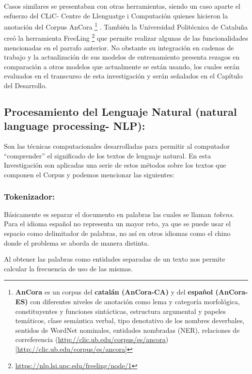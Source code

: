 \documentclass[
  10,
  openany]{book}
\begin{document}
Casos similares se presentaban con otras herramientas, siendo un caso aparte el esfuerzo del CLiC- Centre de Llenguatge i Computación quienes hicieron la anotación del Corpus AnCora \footnote{\textbf{AnCora} es un corpus del \textbf{catalán (AnCora-CA)} y del \textbf{español (AnCora-ES)} con diferentes niveles de anotación como lema y categoría morfológica, constituyentes y funciones sintácticas, estructura argumental y papeles temáticos, clase semántica verbal, tipo denotativo de los nombres deverbales, sentidos de WordNet nominales, entidades nombradas (NER), relaciones de correferencia (\url{http://clic.ub.edu/corpus/es/ancora}){[}\url{http://clic.ub.edu/corpus/es/ancora}{]}} . También la Universidad Politécnica de Cataluña creó la herramienta FreeLing \footnote{\url{https://nlp.lsi.upc.edu/freeling/node/1}} que permite realizar algunas de las funcionalidades mencionadas en el parrafo anterior. No obstante su integración en cadenas de trabajo y la actualización de sus modelos de entrenamiento presenta rezagos en comparación a otros modelos que actualmente se están usando, los cuales serán evaluados en el transcurso de esta investigación y serán señalados en el Capítulo del Desarrollo.

\hypertarget{nlproc}{%
\subsection{Procesamiento del Lenguaje Natural (natural language processing- NLP):}\label{nlproc}}

Son las técnicas computacionales desarrolladas para permitir al computador ``comprender'' el significado de los textos de lenguaje natural. En esta Investigación son aplicadas una serie de estos métodos sobre los textos que componen el Corpus y podemos mencionar las siguientes:

\hypertarget{tokenizador}{%
\subsubsection{Tokenizador:}\label{tokenizador}}

Básicamente es separar el documento en palabras las cuales se llaman \emph{tokens}. Para el idioma español no representa un mayor reto, ya que se puede usar el espacio como delimitador de palabras, no así en otros idiomas como el chino donde el problema se aborda de manera distinta.

Al obtener las palabras como entidades separadas de un texto nos permite calcular la frecuencia de uso de las mismas.
\end{document}
